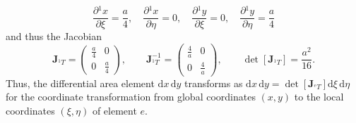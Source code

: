 \documentclass[a4paper,11pt]{article}
\numberwithin{equation}{section}
\newcommand\matr[1]{\ensuremath{\boldsymbol{\mathbf{#1}}}}
\begin{document}
{\begin{equation}
	\frac{\partial {}^1 x}{\partial \xi} = \frac{a}{4}, \quad \frac{\partial {}^1 x}{\partial \eta} = 0, \quad \frac{\partial {}^1 y}{\partial \xi} = 0, \quad \frac{\partial {}^1 y}{\partial \eta} = \frac{a}{4}
\end{equation} and thus the Jacobian \begin{equation}
	\matr{J}_{{}^1 T} = \begin{pmatrix}
		\frac{a}{4} & 0 \\
		0 & \frac{a}{4}
	\end{pmatrix}, \qquad \matr{J}_{{}^1 T}^{-1} = \begin{pmatrix}
		\frac{4}{a} & 0 \\
		0 & \frac{4}{a}
	\end{pmatrix}, \qquad \det\left[\matr{J}_{{}^1 T}\right] = \frac{a^2}{16}.
\end{equation} Thus, the differential area element $\mathrm{d}x\,\mathrm{d}y$ transforms as $\mathrm{d}x\,\mathrm{d}y = \det\left[\matr{J}_{{}^e T}\right]\mathrm{d}\xi\,\mathrm{d}\eta$ for the coordinate transformation from global coordinates $(x,y)$ to the local coordinates $(\xi,\eta)$ of element $e$.

}
\end{document}

